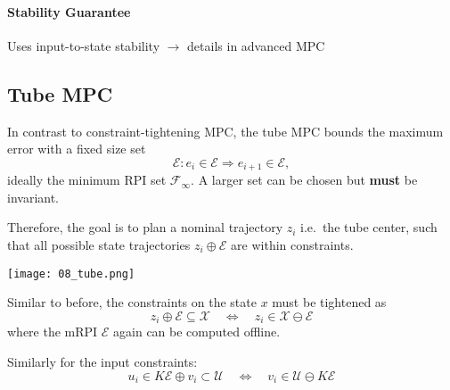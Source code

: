 \paragraph{Stability Guarantee}
Uses input-to-state stability $\rightarrow$ details in advanced MPC

\subsection{Tube MPC}
In contrast to constraint-tightening MPC, the tube MPC bounds the maximum error with a fixed size set
\begin{equation*}
    \mathcal{E}:e_i \in \mathcal{E} \Rightarrow e_{i+1}\in \mathcal{E},
\end{equation*}
ideally the minimum RPI set $\mathcal{F}_\infty$. A larger set can be chosen but \textbf{must} be invariant.

\newpar{}
Therefore, the goal is to plan a nominal trajectory $z_i$ i.e.\ the tube center, such that all possible state trajectories $z_i\oplus \mathcal{E}$ are within constraints.

\begin{center}
    \texttt{[image: 08\_tube.png]}
\end{center}

\newpar{}

Similar to before, the constraints on the state $x$ must be tightened as
\begin{equation*}
    z_i \oplus \mathcal{E} \subseteq \mathcal{X} \quad \Leftrightarrow \quad z_i \in \mathcal{X}\ominus \mathcal{E}
\end{equation*}
where the mRPI $\mathcal{E}$ again can be computed offline.

\newpar{}
Similarly for the input constraints:
\begin{equation*}
    u_i \in K \mathcal{E} \oplus v_i \subset \mathcal{U}\quad \Leftrightarrow \quad v_i \in \mathcal{U} \ominus K\mathcal{E}
\end{equation*}

